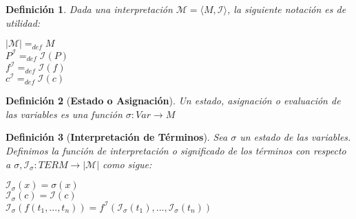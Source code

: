\documentclass[letterpaper,11pt]{article}
\newtheorem{teo}{Definición}[]
\begin{document}
\begin{enumerate}
\begin{itemize}
\begin{teo}
                Dada una interpretación $\mathcal{M} = \langle M, 
                \mathcal{I} \rangle$, la siguiente notación es de utilidad:
                \begin{center}
                    $|\mathcal{M}| =_{def} M$ \\
                    $P^{\mathcal{I}} =_{def} \mathcal{I}(P)$ \\
                    $f^{\mathcal{I}} =_{def} \mathcal{I}(f)$ \\
                    $c^{\mathcal{I}} =_{def} \mathcal{I}(c)$
                \end{center}
            \end{teo}

            \begin{teo}[\textbf{Estado o Asignación}]
                Un estado, asignación o evaluación de las variables es una
                función $\sigma: Var \rightarrow M$
            \end{teo}

            \begin{teo}[\textbf{Interpretación de Términos}]
                Sea $\sigma$ un estado de las variables. Definimos la función
                de interpretación o significado de los términos con respecto a
                $\sigma, \mathcal{I_{\sigma}}: TERM \rightarrow |\mathcal{M}|$
                como sigue:
                \begin{center}
                    $\mathcal{I_{\sigma}}(x) = \sigma(x)$ \\
                    $\mathcal{I_{\sigma}}(c) = \mathcal{I}(c)$ \\
                    $\mathcal{I_{\sigma}}(f(t_{1},...,t_{n})) =
                    f^{\mathcal{I}}(\mathcal{I_{\sigma}}(t_{1}),...,
                    \mathcal{I_{\sigma}}(t_{n}))$                
                \end{center}
            \end{teo}


\end{itemize}
\end{enumerate}
\end{document}
